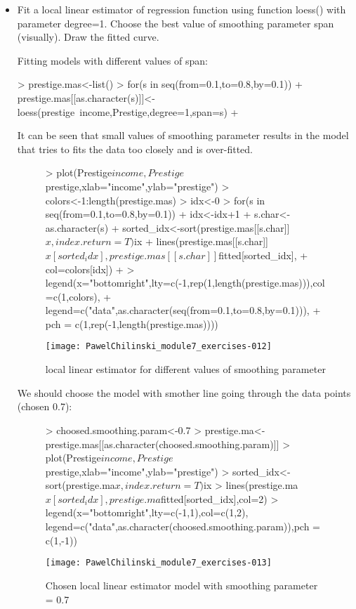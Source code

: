\documentclass[a4paper]{article}
\begin{document}
\begin{itemize}
\item Fit a local linear estimator of regression function using function loess()
with parameter degree=1. Choose the best value of smoothing parameter span (visually). Draw the fitted curve.

Fitting models with different values of span:
\begin{Schunk}
\begin{Sinput}
> prestige.mas<-list()
> for(s in seq(from=0.1,to=0.8,by=0.1)){
+ 	prestige.mas[[as.character(s)]]<-loess(prestige~income,Prestige,degree=1,span=s)	
+ }
\end{Sinput}
\end{Schunk}
It can be seen that small values of smoothing parameter results in the model
that tries to fits the data too closely and is over-fitted. 
\begin{figure}[H]
\begin{center}
\begin{Schunk}
\begin{Sinput}
> plot(Prestige$income,Prestige$prestige,xlab="income",ylab="prestige")
> colors<-1:length(prestige.mas)
> idx<-0
> for(s in seq(from=0.1,to=0.8,by=0.1)){
+ 	idx<-idx+1
+ 	s.char<-as.character(s)
+ 	sorted_idx<-sort(prestige.mas[[s.char]]$x,index.return=T)$ix
+ 	lines(prestige.mas[[s.char]]$x[sorted_idx],prestige.mas[[s.char]]$fitted[sorted_idx],
+ 			col=colors[idx])	
+ }
> legend(x="bottomright",lty=c(-1,rep(1,length(prestige.mas))),col=c(1,colors), 
+ 		legend=c("data",as.character(seq(from=0.1,to=0.8,by=0.1))),
+ 		pch = c(1,rep(-1,length(prestige.mas))))
\end{Sinput}
\end{Schunk}
\texttt{[image: PawelChilinski\_module7\_exercises-012]}
\caption{local linear estimator for different values of smoothing parameter}
\end{center}
\end{figure}

We should choose the model with smother line going through the data points
(chosen 0.7):
\begin{figure}[H]
\begin{center}
\begin{Schunk}
\begin{Sinput}
> choosed.smoothing.param<-0.7
> prestige.ma<-prestige.mas[[as.character(choosed.smoothing.param)]]
> plot(Prestige$income,Prestige$prestige,xlab="income",ylab="prestige")
> sorted_idx<-sort(prestige.ma$x,index.return=T)$ix
> lines(prestige.ma$x[sorted_idx],prestige.ma$fitted[sorted_idx],col=2)	
> legend(x="bottomright",lty=c(-1,1),col=c(1,2), legend=c("data",as.character(choosed.smoothing.param)),pch = c(1,-1))
\end{Sinput}
\end{Schunk}
\texttt{[image: PawelChilinski\_module7\_exercises-013]}
\caption{Chosen local linear estimator model with smoothing parameter =
0.7}
\end{center}
\end{figure}


\end{itemize}
\end{document}
